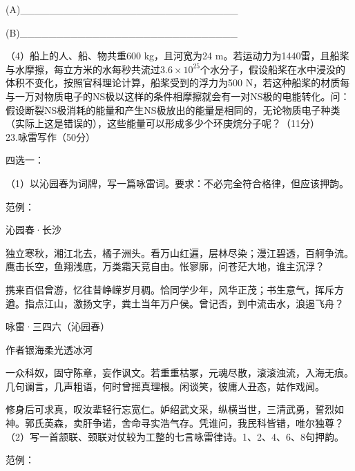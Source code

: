 \documentclass[UTF8,12pt,oneside]{ctexbook}
\begin{document}
    (A)\_\_\_\_\_\_\_\_\_\_\_\_\_\_\_\_\_\_\_\_\_\_\_\_\_\_\_\_\_\_
    
    (B)\_\_\_\_\_\_\_\_\_\_\_\_\_\_\_\_\_\_\_\_\_\_\_\_\_\_\_\_\_\_
    
    （4）船上的人、船、物共重600 kg，且河宽为24 m。若运动力为1440雷，且船桨与水摩擦，每立方米的水每秒共流过$3.6×10^{25}$个水分子，假设船桨在水中浸没的体积不变化，按照官科理论计算，船桨受到的浮力为500 N，若这种船桨的材质每与一万对物质电子的NS极以这样的条件相摩擦就会有一对NS极的电能转化。问：假设断裂NS极消耗的能量和产生NS极放出的能量是相同的，无论物质电子种类（实际上这是错误的），这些能量可以形成多少个环庚烷分子呢？（11分）
    ~\\
    
    23.咏雷写作（50分）
    
    四选一：
    
    （1）以沁园春为词牌，写一篇咏雷词。要求：不必完全符合格律，但应该押韵。
    
    范例：
    
    \begin{center}
        \large\kaishu
        沁园春·长沙
        \songti\normalsize
    \end{center}
    
    \fangsong
    独立寒秋，湘江北去，橘子洲头。看万山红遍，层林尽染；漫江碧透，百舸争流。鹰击长空，鱼翔浅底，万类霜天竞自由。怅寥廓，问苍茫大地，谁主沉浮？
    
    携来百侣曾游，忆往昔峥嵘岁月稠。恰同学少年，风华正茂；书生意气，挥斥方遒。指点江山，激扬文字，粪土当年万户侯。曾记否，到中流击水，浪遏飞舟？
    \songti
    
    \begin{center}
        \large\kaishu
        咏雷·三四六（沁园春）
        \songti\normalsize
        
        作者\qquad 银海柔光透冰河
    \end{center}
    
    \fangsong
    一众科奴，固守陈章，妄作讽文。若重重枯冢，元魂尽散，滚滚浊流，入海无痕。几句谰言，几声粗语，何时曾摇真理根。闲谈笑，彼庸人丑态，姑作戏闻。
    
    修身后可求真，叹汝辈轻行忘宽仁。妒绍武文采，纵横当世，三清武勇，誓烈如神。郭氏英森，卖肝争诺，舍命寻实浩气存。凭谁问，我民科皆错，唯尔独尊？
    \songti
    ~\\
    
    （2）写一首颔联、颈联对仗较为工整的七言咏雷律诗。1、2、4、6、8句押韵。
    
    范例：
    
\end{document}
